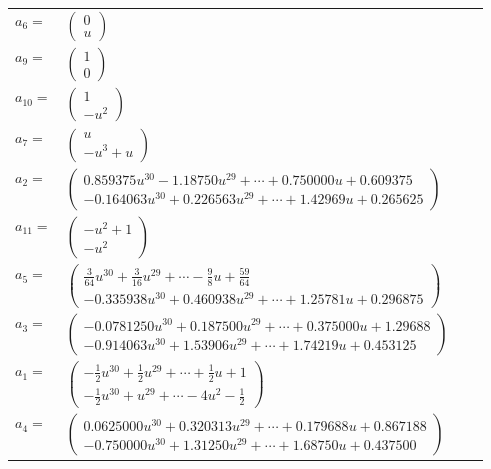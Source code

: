 \documentclass[1p]{elsarticle_modified}
\theoremstyle{definition}
\begin{document}
\begin{tabular}{m{7pt} m{180pt} m{7pt} m{180pt} }
\flushright $a_{6}=$&$\begin{pmatrix}0\\u\end{pmatrix}$ \\
\flushright $a_{9}=$&$\begin{pmatrix}1\\0\end{pmatrix}$ \\
\flushright $a_{10}=$&$\begin{pmatrix}1\\- u^2\end{pmatrix}$ \\
\flushright $a_{7}=$&$\begin{pmatrix}u\\- u^3+u\end{pmatrix}$ \\
\flushright $a_{2}=$&$\begin{pmatrix}0.859375 u^{30}-1.18750 u^{29}+\cdots+0.750000 u+0.609375\\-0.164063 u^{30}+0.226563 u^{29}+\cdots+1.42969 u+0.265625\end{pmatrix}$ \\
\flushright $a_{11}=$&$\begin{pmatrix}- u^2+1\\- u^2\end{pmatrix}$ \\
\flushright $a_{5}=$&$\begin{pmatrix}\frac{3}{64} u^{30}+\frac{3}{16} u^{29}+\cdots-\frac{9}{8} u+\frac{59}{64}\\-0.335938 u^{30}+0.460938 u^{29}+\cdots+1.25781 u+0.296875\end{pmatrix}$ \\
\flushright $a_{3}=$&$\begin{pmatrix}-0.0781250 u^{30}+0.187500 u^{29}+\cdots+0.375000 u+1.29688\\-0.914063 u^{30}+1.53906 u^{29}+\cdots+1.74219 u+0.453125\end{pmatrix}$ \\
\flushright $a_{1}=$&$\begin{pmatrix}-\frac{1}{2} u^{30}+\frac{1}{2} u^{29}+\cdots+\frac{1}{2} u+1\\-\frac{1}{2} u^{30}+u^{29}+\cdots-4 u^2-\frac{1}{2}\end{pmatrix}$ \\
\flushright $a_{4}=$&$\begin{pmatrix}0.0625000 u^{30}+0.320313 u^{29}+\cdots+0.179688 u+0.867188\\-0.750000 u^{30}+1.31250 u^{29}+\cdots+1.68750 u+0.437500\end{pmatrix}$ \\

\end{tabular}
\end{document}
